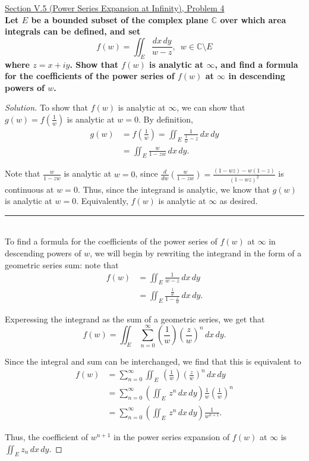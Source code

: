 \documentclass[11pt]{article}
\newcommand{\C}{\mathbb{C}}
\newcommand{\Sum}{\sum\limits_{n=0}^{\infty}}
\newenvironment{solution}
  {\renewcommand\qedsymbol{$\blacksquare$}\begin{proof}[Solution]}
  {\end{proof}}
\theoremstyle{definition}
\begin{document}
\underline{Section V.5 (Power Series Expansion at Infinity), Problem 4} \\

\textbf{Let $E$ be a bounded subset of the complex plane $\C$ over which area integrals can be defined, and set}
\[ f(w) = \iint_{E} \frac{dx \, dy}{w-z}, \, \, \, w \in \C \setminus E \]
\textbf{where $z = x+iy$. Show that $f(w)$ is analytic at $\infty$, and find a formula for the coefficients of the power series of $f(w)$ at 
$\infty$ in descending powers of $w$.}

\begin{solution}
To show that $f(w)$ is analytic at $\infty$, we can show that $g(w) = f\left(\frac{1}{w}\right)$ is analytic at $w = 0$. By definition,
\begin{align*} g(w) &= f\left(\frac{1}{w}\right) = \iint_E \frac{1}{\frac{1}{w} - z} \, dx \, dy \\
&= \iint_E \frac{w}{1-zw} \, dx \, dy.\end{align*}

Note that $\frac{w}{1-zw}$ is analytic at $w = 0$, since $\frac{d}{dw} \left(\frac{w}{1-zw}\right) = \frac{(1-wz) - w(1-z)}{(1-wz)^2}$ is continuous at $w=0$. Thus, since the integrand is analytic, we know that $g(w)$ is analytic at $w=0$. 
Equivalently, $f(w)$ is analytic at $\infty$ as desired. 

\noindent\rule{\textwidth}{1pt} \\

To find a formula for the coefficients of the power series of $f(w)$ at $\infty$ in descending powers of $w$, we will begin by rewriting the integrand in the form
of a geometric series sum: note that
\begin{align*} f(w) &= \iint_{E} \frac{1}{w-z} \, dx \, dy \\
&= \iint_{E} \frac{\frac{1}{w}}{1 - \frac{z}{w}} \, dx \, dy. \end{align*}

Experessing the integrand as the sum of a geometric series, we get that 
\[ f(w) = \iint_{E} \, \Sum \left(\frac{1}{w}\right)\left(\frac{z}{w}\right)^n \, dx \, dy. \]

Since the integral and sum can be interchanged, we find that this is equivalent to
\begin{align*} f(w) &= \Sum \iint_{E} \, \left(\frac{1}{w}\right)\left(\frac{z}{w}\right)^n \, dx \, dy \\
&= \Sum \left(\iint_{E} \, z^n \, dx \, dy \right)\frac{1}{w} \left(\frac{1}{w}\right)^n \\
&= \Sum \left(\iint_{E} \, z^n \, dx \, dy \right) \frac{1}{w^{n+1}}.  \end{align*}

Thus, the coefficient of $w^{n+1}$ in the power series expansion of $f(w)$ at $\infty$ is $\boxed{\iint_E z_n \, dx \, dy}$.
\end{solution}
\end{document}
